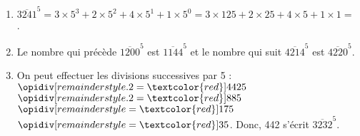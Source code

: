 \ \\ [-5mm]
\begin{enumerate}
      \item $\overline{3241}^5 =3\times5^3+2\times5^2+4\times5^1+1\times5^0 =3\times125+2\times25+4\times5+1\times1 = $ {}.
      \item Le nombre qui précède $\overline{1200}^5$ est {\blue $\overline{1144}^5$} et le nombre qui suit $\overline{4214}^5$ est {\blue $\overline{4220}^5$}.
      \item On peut effectuer les divisions successives par 5 : \\
      $\opidiv[remainderstyle.2=\textcolor{red}]{442}{5}$ \quad $\opidiv[remainderstyle.2=\textcolor{red}]{88}{5}$ \quad $\opidiv[remainderstyle=\textcolor{red}]{17}{5}$ \quad $\opidiv[remainderstyle=\textcolor{red}]{3}{5}$. \qquad Donc, 442 s'écrit {\blue $\overline{3232}^5$}.
   \end{enumerate}

